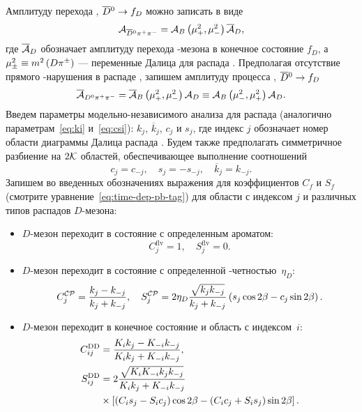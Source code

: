 Амплитуду перехода \bdbpp, $\overline{D}{}^0\to f_D$ можно записать в виде
\begin{equation}
 \mathcal{A}_{\overline{D}{}^0\pi^+\pi^-} = \mathcal{A}_B\left(\mu_+^2,\mu_-^2\right)\overline{\mathcal{A}}_D,
\end{equation}
где $\overline{\mathcal{A}}_D$ обозначает амплитуду перехода \dnbar-мезона в конечное состояние $f_D$, а $\mu^2_{\pm}\equiv m^2\left( D\pi^{\pm}\right)$ --- переменные Далица для распада \bdbpp.  Предполагая отсутствие прямого \cpconj-нарушения в распаде \bdbpp, запишем амплитуду процесса \bbdpp, $\overline{D}{}^0\to f_D$
\begin{equation}
 \overline{\mathcal{A}}{}_{D^0\pi^+\pi^-} = \overline{\mathcal{A}}_B\left(\mu_+^2,\mu_-^2\right)\mathcal{A}_D\equiv\mathcal{A}_B\left(\mu_-^2,\mu_+^2\right)\mathcal{A}_D.
\end{equation}
Введем параметры модельно-независимого анализа для распада \bdbpp (аналогично параметрам~\eqref{eq:ki} и~\eqref{eq:csi}): $k_j$, $\overline{k}_j$, $c_j$ и $s_j$, где индекс $j$ обозначает номер области диаграммы Далица распада \bdbpp.  Будем также предполагать симметричное разбиение на $2\mathcal{K}$ областей, обеспечивающее выполнение соотношений
\begin{equation}
 c_j = c_{-j},\quad s_j = -s_{-j},\quad \overline{k}_j = k_{-j}.
\end{equation}
Запишем во введенных обозначениях выражения для коэффициентов $C_f$ и $S_f$ (смотрите уравнение~\eqref{eq:time-dep-pb-tag}) для области с индексом $j$ и различных типов распадов $D$-мезона:
\begin{itemize}
 \item $D$-мезон переходит в состояние с определенным ароматом:
 \begin{equation}\label{eq:flv_pdf}
 C^{\mathrm{flv}}_j = 1,\quad S^{\mathrm{flv}}_j = 0.
\end{equation}
 \item $D$-мезон переходит в состояние с определенной \cpconj-четностью~$\eta_D$:
 \begin{equation}\label{eq:cp_pdf}
 C^{\mathcal{CP}}_j = \frac{k_j-k_{-j}}{k_j+k_{-j}},\quad S^{\mathcal{CP}}_j = 2\eta_D\frac{\sqrt{k_{j}k_{-j}}}{k_j+k_{-j}}\left(s_j\cos{2\ensuremath{\beta}}-c_j\sin{2\ensuremath{\beta}}\right).
\end{equation}
\item $D$-мезон переходит в конечное состояние \kspp и область с индексом~$i$:
\begin{equation}\label{eq:dd_pdf}
\begin{split}
 C^{\mathrm{DD}}_{ij} & = \frac{K_i k_j-K_{-i} k_{-j}}{K_i k_j+K_{-i} k_{-j}},\\
 S^{\mathrm{DD}}_{ij} & = 2\frac{\sqrt{K_iK_{-i} k_{j}k_{-j}}}{K_i k_j+K_{-i} k_{-j}} \\
             & \times \left[\left(C_i s_j-S_i c_j\right)\cos{2\ensuremath{\beta}}-\left(C_i c_j+S_i s_j\right)\sin{2\ensuremath{\beta}}\right].
\end{split}
\end{equation}
\end{itemize}
